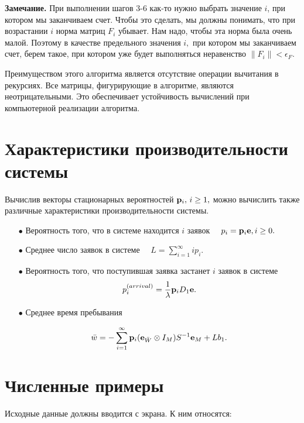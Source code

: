 \documentclass[12pt,a4paper]{article}
\begin{document}
{\bf Замечание.} При выполнении шагов 3-6 как-то нужно выбрать значение $i$, при котором мы заканчиваем счет. Чтобы это 
сделать,  мы должны понимать, что при возрастании $i$ норма матриц $F_i$ убывает. Нам надо, чтобы эта норма была очень 
малой. Поэтому в качестве предельного значения $i,$ при котором мы заканчиваем  счет, берем такое, при котором уже будет 
выполняться неравенство $\|F_i\|< \epsilon_F.$


Преимуществом этого алгоритма является отсутствие операции вычитания в рекурсиях. Все матрицы, фигурирующие в алгоритме, 
являются неотрицательными.
Это обеспечивает устойчивость вычислений при компьютерной реализации алгоритма.

\section{Характеристики производительности системы }

 Вычислив векторы стационарных вероятностей ${\bf p}_i, \, i \geq 1,$ можно вычислить  также различные характеристики 
 производительности системы.



\begin{itemize}


\item[$\bullet$] Вероятность того, что в системе  находится $i$ заявок
$\quad
p_i={\bf p}_i{\bf e}, i\geq0.
$

 \item[$\bullet$] Среднее число заявок в системе
 $\quad
L= \sum\limits_{i=1}^\infty i p_i.
 $


\item[$\bullet$] Вероятность того, что поступившая заявка застанет $i$ заявок  в системе
$$
p_i^{(arrival)}=\frac{1}{\lambda}{\bf p}_iD_1{\bf e}.
   $$

 \item[$\bullet$]  Среднее время пребывания

 $$
 \bar{w}=-\sum\limits_{i=1}^\infty  {\bf p}_i({\bf e}_{\bar{W}}\otimes I_M)S^{-1} {\bf e}_M+Lb_1.
 $$


  \end{itemize}

\section{Численные примеры }

Исходные данные должны вводится с экрана. К ним относятся:
\end{document}

